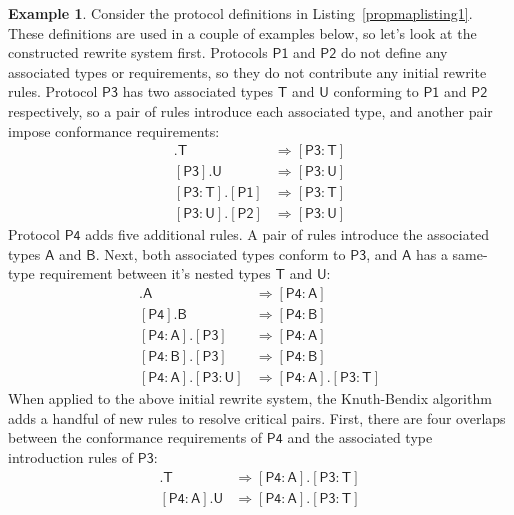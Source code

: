 \documentclass[headsepline,bibliography=totoc]{scrreport}
\newcommand{\namesym}[1]{\mathsf{#1}}
\newcommand{\proto}[1]{\bm{\mathsf{#1}}}
\newcommand{\protosym}[1]{[\proto{#1}]}
\newcommand{\assocsym}[2]{[\proto{#1}\colon\namesym{#2}]}
\theoremstyle{definition}
\newtheorem{example}{Example}[chapter]
\theoremstyle{definition}
\theoremstyle{definition}
\begin{document}
\begin{example}\label{propmapexample1}
Consider the protocol definitions in Listing~\ref{propmaplisting1}. These definitions are used in a couple of examples below, so let's look at the constructed rewrite system first. Protocols $\proto{P1}$ and $\proto{P2}$ do not define any associated types or requirements, so they do not contribute any initial rewrite rules. Protocol $\proto{P3}$ has two associated types $\namesym{T}$ and $\namesym{U}$ conforming to $\proto{P1}$ and $\proto{P2}$ respectively, so a pair of rules introduce each associated type, and another pair impose conformance requirements:
\begin{align}
\protosym{P3}.\namesym{T}&\Rightarrow\assocsym{P3}{T}\tag{1}\\
\protosym{P3}.\namesym{U}&\Rightarrow\assocsym{P3}{U}\tag{2}\\
\assocsym{P3}{T}.\protosym{P1}&\Rightarrow\assocsym{P3}{T}\tag{3}\\
\assocsym{P3}{U}.\protosym{P2}&\Rightarrow\assocsym{P3}{U}\tag{4}
\end{align}
Protocol $\proto{P4}$ adds five additional rules. A pair of rules introduce the associated types $\namesym{A}$ and $\namesym{B}$. Next, both associated types conform to $\proto{P3}$, and $\namesym{A}$ has a same-type requirement between it's nested types $\namesym{T}$ and $\namesym{U}$:
\begin{align}
\protosym{P4}.\namesym{A}&\Rightarrow\assocsym{P4}{A}\tag{5}\\
\protosym{P4}.\namesym{B}&\Rightarrow\assocsym{P4}{B}\tag{6}\\
\assocsym{P4}{A}.\protosym{P3}&\Rightarrow\assocsym{P4}{A}\tag{7}\\
\assocsym{P4}{B}.\protosym{P3}&\Rightarrow\assocsym{P4}{B}\tag{8}\\
\assocsym{P4}{A}.\assocsym{P3}{U}&\Rightarrow\assocsym{P4}{A}.\assocsym{P3}{T}\tag{9}
\end{align}
When applied to the above initial rewrite system, the Knuth-Bendix algorithm adds a handful of new rules to resolve critical pairs. First, there are four overlaps between the conformance requirements of $\proto{P4}$ and the associated type introduction rules of $\proto{P3}$:
\begin{align}
\assocsym{P4}{A}.\namesym{T}&\Rightarrow\assocsym{P4}{A}.\assocsym{P3}{T}\tag{10}\\
\assocsym{P4}{A}.\namesym{U}&\Rightarrow\assocsym{P4}{A}.\assocsym{P3}{T}\tag{11}\\

\end{align}
\end{example}
\end{document}
